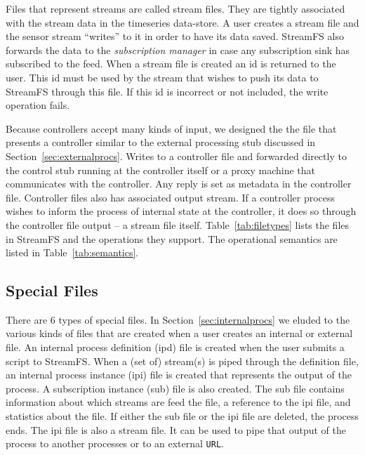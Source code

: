 Files that represent streams are called stream files.  They are tightly associated with the stream data in the timeseries data-store.
A user creates a stream file and the sensor  stream ``writes'' to it in order to have its data saved.  StreamFS also forwards the
data to the \emph{subscription manager} in case any subscription sink has subscribed to the feed.  When a stream file is created an id is 
returned to the user.  This id must be used by the stream that wishes to push its data to StreamFS through this file.  If this id is incorrect
or not included, the write operation fails.

Because controllers accept many kinds of input, we designed the the file that presents a controller similar to the external processing stub discussed
in Section~\ref{sec:externalprocs}.  Writes to a controller file and forwarded directly to the control stub running at the controller itself or a proxy
machine that communicates with the controller.  Any reply is set as metadata in the controller file.  Controller files also has associated output stream.
If a controller process wishes to inform the process of internal state at the controller, it does so through the controller file output --
a stream file itself.  Table~\ref{tab:filetypes} lists the files in StreamFS and the operations they support.  The operational semantics
are listed in Table~\ref{tab:semantics}.



\subsection{Special Files}
There are 6 types of special files.  In Section~\ref{sec:internalprocs} we eluded to the various kinds of files that are created
when a user creates an internal or external file.  An internal process definition (ipd) file is created when the user
submits a script to StreamFS.  When a (set of) stream(s) is piped through the definition file, an internal process instance (ipi) file
is created that represents the output of the process.  A subscription instance (sub) file is also created.  The sub file contains
information about which streams are feed the file, a reference to the ipi file, and statistics about the file.  If either
the sub file or the ipi file are deleted, the process ends.  The ipi file is also a stream file.  It can be used to pipe that
output of the process to another processes or to an external \texttt{URL}.

